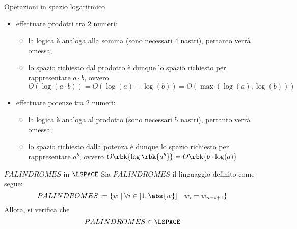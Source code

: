 \documentclass[a4paper, 12pt]{report}
\begin{document}
\begin{framedprop}[label={log space ops}, breakable]{Operazioni in spazio logaritmico}
\begin{itemize}
\begin{itemize}
                    \item lo spazio richiesto dalla differenza è dunque lo spazio richiesto per rappresentare $a$, ovvero $O(\log(a))$;
                \end{itemize}
            \item effettuare prodotti tra 2 numeri:
                \begin{itemize}
                    \item la logica è analoga alla somma (sono necessari 4 nastri), pertanto verrà omessa;
                    \item lo spazio richiesto dal prodotto è dunque lo spazio richiesto per rappresentare $a \cdot b$, ovvero $O(\log(a \cdot b)) = O(\log(a) + \log(b)) = O(\max(\log(a), \log(b)))$
                \end{itemize}
            \item effettuare potenze tra 2 numeri:
                \begin{itemize}
                    \item la logica è analoga al prodotto (sono necessari 5 nastri), pertanto verrà omessa;
                    \item lo spazio richiesto dalla potenza è dunque lo spazio richiesto per rappresentare $a^b$, ovvero $O \rbk{\log \rbk{a^b}} = O \rbk{b \cdot \log(a)}$
                \end{itemize}
        \end{itemize}
    \end{framedprop}

    \begin{framedthm}{$PALINDROMES$ in $\LSPACE$}
        Sia $PALINDROMES$ il linguaggio definito come segue: $$PALINDROMES := \{w \mid \forall i \in [1, \abs{w}] \quad w_i = w_{n - i + 1}\}$$ Allora, si verifica che $$PALINDROMES \in \LSPACE$$
    \end{framedthm}
\end{document}
